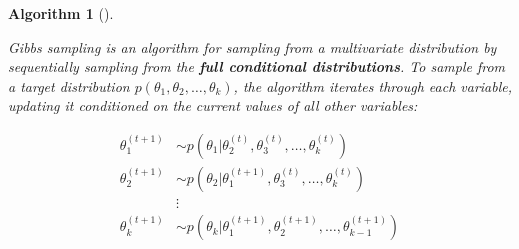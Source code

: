 \documentclass[
  letterpaper,
  DIV=11,
  numbers=noendperiod]{scrreprt}
\renewcommand{\[}{\begin{equation}}
\renewcommand{\]}{\end{equation}}
\theoremstyle{definition}
\theoremstyle{plain}
\newtheorem{algorithm}{Algorithm}[chapter]
\theoremstyle{plain}
\theoremstyle{plain}
\theoremstyle{definition}
\theoremstyle{plain}
\theoremstyle{remark}
\begin{document}
\begin{algorithm}[]\protect\hypertarget{alg-gibbs-sampling}{}\label{alg-gibbs-sampling}

Gibbs sampling is an algorithm for sampling from a multivariate
distribution by sequentially sampling from the \textbf{full conditional
distributions}. To sample from a target distribution
\(p(\theta_1, \theta_2, \dots, \theta_k)\), the algorithm iterates
through each variable, updating it conditioned on the current values of
all other variables:

\[
\begin{aligned}
\theta_1^{(t+1)} &\sim p(\theta_1 | \theta_2^{(t)}, \theta_3^{(t)}, \dots, \theta_k^{(t)}) \\
\theta_2^{(t+1)} &\sim p(\theta_2 | \theta_1^{(t+1)}, \theta_3^{(t)}, \dots, \theta_k^{(t)}) \\
&\vdots \\
\theta_k^{(t+1)} &\sim p(\theta_k | \theta_1^{(t+1)}, \theta_2^{(t+1)}, \dots, \theta_{k-1}^{(t+1)})
\end{aligned}
\]

\end{algorithm}
\end{document}
